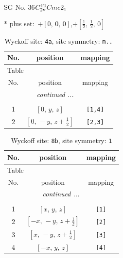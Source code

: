 \documentclass[fleqn,8pt]{jsarticle}
\begin{document}
\setcounter{MaxMatrixCols}{32}

\renewcommand{\tablename}{Table~}
\renewcommand{\figurename}{Figure~}
\begin{center}
\LARGE
SG No. 36\quad$C_{\rm 2v}^{12}$\quad$Cmc2_1$\quad[ orthorhombic ]
\end{center}
* plus set:\,\,\,$+\left[ 0,\, 0,\, 0 \right]$,\quad $+\left[ \frac{1}{2},\, \frac{1}{2},\, 0 \right]$
\renewcommand{\arraystretch}{1.2}
\begin{longtable}{ccc}
\caption{Wyckoff site: {\tt 4a}, site symmetry: {\tt m..}}
 \\
 \hline \hline
No. & position & mapping \\ \hline \endfirsthead

\multicolumn{2}{l}{\tablename\ \thetable{}} \\
 \hline \hline
No. & position & mapping \\ \hline \endhead

 \hline \hline
\multicolumn{2}{r}{\footnotesize\it continued ...} \\ \endfoot

 \hline \hline
\multicolumn{2}{r}{} \\ \endlastfoot

1 & $\left[ 0,\, y,\, z \right]$ & {\tt [1,4]} \\ \hline
2 & $\left[ 0,\, - y,\, z + \frac{1}{2} \right]$ & {\tt [2,3]} \\
\end{longtable}
\renewcommand{\arraystretch}{1.2}
\begin{longtable}{ccc}
\caption{Wyckoff site: {\tt 8b}, site symmetry: {\tt 1}}
 \\
 \hline \hline
No. & position & mapping \\ \hline \endfirsthead

\multicolumn{2}{l}{\tablename\ \thetable{}} \\
 \hline \hline
No. & position & mapping \\ \hline \endhead

 \hline \hline
\multicolumn{2}{r}{\footnotesize\it continued ...} \\ \endfoot

 \hline \hline
\multicolumn{2}{r}{} \\ \endlastfoot

1 & $\left[ x,\, y,\, z \right]$ & {\tt [1]} \\ \hline
2 & $\left[ - x,\, - y,\, z + \frac{1}{2} \right]$ & {\tt [2]} \\ \hline
3 & $\left[ x,\, - y,\, z + \frac{1}{2} \right]$ & {\tt [3]} \\ \hline
4 & $\left[ - x,\, y,\, z \right]$ & {\tt [4]} \\
\end{longtable}
\end{document}
